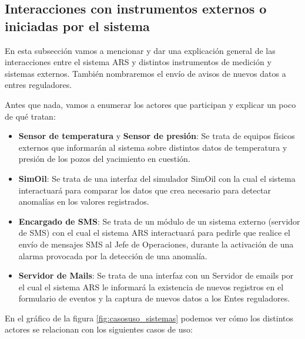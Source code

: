 \subsection{Interacciones con instrumentos externos o iniciadas por el sistema}

\par En esta subsección vamos a mencionar y dar una explicación general de las interacciones entre el sistema ARS y distintos instrumentos de medición y sistemas externos. También nombraremos el envío de avisos de nuevos datos a entres reguladores.

\par Antes que nada, vamos a enumerar los actores que participan y explicar un poco de qué tratan:
\begin{itemize}
  \item \textbf{Sensor de temperatura} y \textbf{Sensor de presión}: Se trata de equipos físicos externos que informarán al sistema sobre distintos datos de temperatura y presión de los pozos del yacimiento en cuestión.
  \item \textbf{SimOil}: Se trata de una interfaz del simulador SimOil con la cual el sistema interactuará para comparar los datos que crea necesario para detectar anomalías en los valores registrados.
  \item \textbf{Encargado de SMS}: Se trata de un módulo de un sistema externo (servidor de SMS) con el cual el sistema ARS interactuará para pedirle que realice el envío de mensajes SMS al Jefe de Operaciones, durante la activación de una alarma provocada por la detección de una anomalía.
  \item \textbf{Servidor de Mails}: Se trata de una interfaz con un Servidor de emails por el cual el sistema ARS le informará la existencia de nuevos registros en el formulario de eventos y la captura de nuevos datos a los Entes reguladores.
\end{itemize}

\par En el gráfico de la figura \ref{fig:casosuso_sistemas} podemos ver cómo los distintos actores se relacionan con los siguientes casos de uso:

